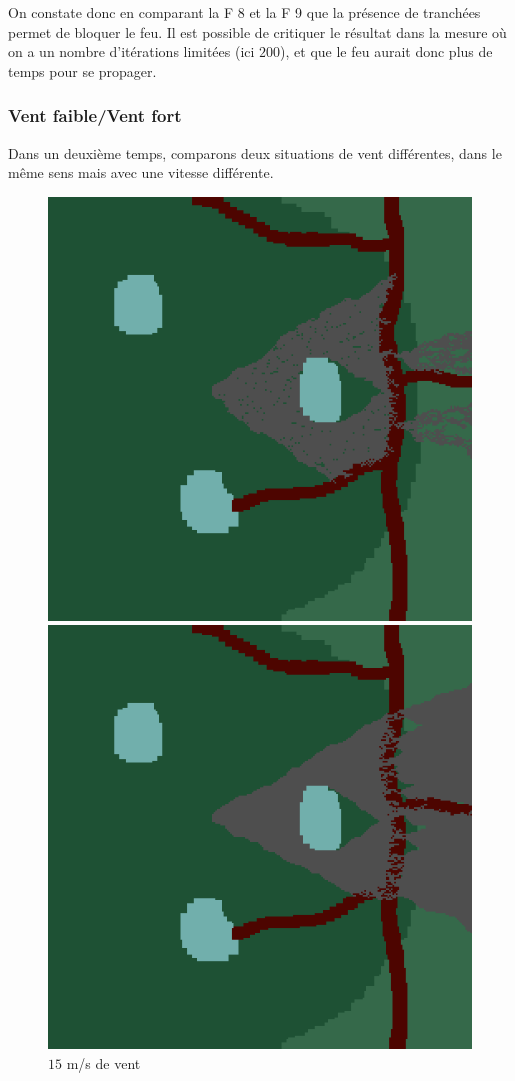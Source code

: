 \documentclass[12pt]{article}
\newcommand{\fig}[1]{
    F\resizebox{!}{1.3ex}{IGURE} #1
}
\begin{document}
On constate donc en comparant la\fig{8}et la\fig{9}que la présence de tranchées permet de bloquer le feu. Il est possible de critiquer le résultat dans la mesure où on a un nombre d'itérations limitées (ici $200$), et que le feu aurait donc plus de temps pour se propager.

\subsubsection{Vent faible/Vent fort}

Dans un deuxième temps, comparons deux situations de vent différentes, dans le même sens mais avec une vitesse différente.

\begin{figure}[!h]
    \centering
    \begin{minipage}{0.35\textwidth}
      \centering
      \includegraphics[width=.8\linewidth]{pictures/trans/treach_15.png}
      \caption{$15$ m/s de vent}\label{Fig:Data7}
    \end{minipage}\hfill
    \begin{minipage}{0.35\textwidth}
      \centering
      \includegraphics[width=.8\linewidth]{pictures/trans/treach_30.png}

\end{minipage}
\end{figure}
\end{document}
